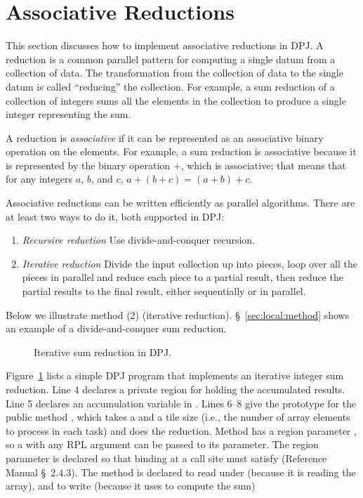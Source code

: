 \section{Associative Reductions%
\label{sec:reductions}}

This section discusses how to implement associative reductions in DPJ.
A reduction is a common parallel pattern for computing a single datum
from a collection of data.  The transformation from the collection of
data to the single datum is called ``reducing'' the collection.  For
example, a sum reduction of a collection of integers sums all the
elements in the collection to produce a single integer representing
the sum.

A reduction is \emph{associative} if it can be represented as an
associative binary operation on the elements.  For example, a sum
reduction is associative because it is represented by the binary
operation $+$, which is associative; that means that for any integers
$a$, $b$, and $c$, $a+(b+c)=(a+b)+c$.  

 Associative reductions can be
written efficiently as parallel algorithms.  There are at least two
ways to do it, both supported in DPJ:
%
\begin{enumerate}
%
\item \emph{Recursive reduction} Use divide-and-conquer recursion.
%
\item \emph{Iterative reduction} Divide the input collection up into
  pieces, loop over all the pieces in parallel and reduce each piece
  to a partial result, then reduce the partial results to the final
  result, either sequentially or in parallel.
%
\end{enumerate}
%
Below we illustrate method (2) (iterative reduction).
\S~\ref{sec:local:method} shows an example of a divide-and-conquer sum
reduction.

\begin{figure}

\caption{Iterative sum reduction in DPJ.}
\label{fig:reductions:pattern}
\end{figure}

Figure~\ref{fig:reductions:pattern} lists a simple DPJ program that
implements an iterative integer sum reduction.  Line 4 declares a
private region  for holding the accumulated results.
Line 5 declares an accumulation variable  in .
Lines 6--8 give the prototype for the public method ,
which takes a  and a tile size (i.e., the number of
array elements to process in each task) and does the reduction.
Method  has a region parameter , so a
 with any RPL argument can be passed to its 
parameter.  The region parameter is declared so that binding
 at a call site must satisfy 
(Reference Manual \S~2.4.3).  The method is declared to read under
 (because it is reading the array), and to write 
(because it uses  to compute the sum)

